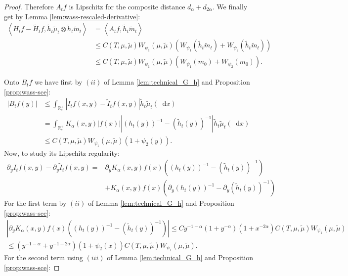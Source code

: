 \documentclass[11pt,a4paper]{article}
\newcommand{\RRP}{\mathbb{R}^+_*}
\newcommand{\brac}[1]{\left\langle#1\right\rangle}
\newcommand{\dd}{\mathop{}\!\mathrm{d}}
\begin{document}
\begin{proof}
    Therefore $A_tf$ is Lipschitz for the composite distance $d_\alpha + d_{2\alpha}$. We finally get by Lemma \ref{lem:wass-rescaled-derivative}:
    \begin{align*}
        \brac{H_tf - \tilde{H}_tf, \tilde{h}_t\tilde{\mu}_t\otimes \tilde{h}_t\tilde{m}_t} 
        &= \brac{A_tf,\tilde{h}_t\tilde{m}_t} \\
        &\leq C(T,\mu,\tilde{\mu}) W_{\psi_1}(\mu,\tilde{\mu}) \left(W_{\psi_1}(\tilde{h}_t\tilde{m}_t) + W_{\psi_2}(\tilde{h}_t\tilde{m}_t) \right)\\
        &\leq C(T,\mu,\tilde{\mu}) W_{\psi_1}(\mu,\tilde{\mu})\left(W_{\psi_1}(m_0) + W_{\psi_2}(m_0) \right).
    \end{align*}

    Onto $B_tf$ we have first by $(ii)$ of Lemma \ref{lem:technical_G_h} and Proposition \ref{prop:wass-sce}:
    \begin{align*}
        \left|B_tf(y) \right| 
        &\leq \int_{\RRP} \left| I_tf(x,y) - \tilde{I}_tf(x,y)\right| \tilde{h}_t \tilde{\mu}_t(\dd x) \\
        &= \int_{\RRP} K_\alpha(x,y) |f(x)| \left| \left(h_t(y) \right)^{-1} - \left(\tilde{h}_t(y) \right)^{-1} \right| \tilde{h}_t \tilde{\mu}_t(\dd x) \\
        &\leq C(T,\mu,\tilde{\mu}) W_{\psi_1}(\mu,\tilde{\mu})   (1 + \psi_2(y)).
    \end{align*}
    Now, to study its Lipschitz regularity:
    \begin{align*}
        \partial_y I_tf(x,y) - \partial_y \tilde{I}_tf(x,y) 
        =& \partial_y K_\alpha(x,y) f(x)\left( \left(h_t(y) \right)^{-1} - \left(\tilde{h}_t(y) \right)^{-1} \right) \\
        &+  K_\alpha(x,y) f(x)\left( \partial_y \left(h_t(y) \right)^{-1} - \partial_y \left(\tilde{h}_t(y) \right)^{-1} \right) 
    \end{align*}
    For the first term by $(ii)$ of Lemma \ref{lem:technical_G_h} and Proposition \ref{prop:wass-sce}:
    \begin{align*}
        \left| \partial_y K_\alpha(x,y) f(x)\left( \left(h_t(y) \right)^{-1} - \left(\tilde{h}_t(y) \right)^{-1} \right) \right| 
        \leq C y^{-1-\alpha} (1 + y^{-\alpha}) (1 + x^{-2\alpha}) C(T,\mu,\tilde{\mu}) W_{\psi_1}(\mu,\tilde{\mu}) \\
        \leq (y^{-1-\alpha} + y^{-1-2\alpha})(1 + \psi_2(x)) C(T,\mu,\tilde{\mu})  W_{\psi_1}(\mu,\tilde{\mu}).
    \end{align*}
    For the second term using $(iii)$ of Lemma \ref{lem:technical_G_h} and Proposition \ref{prop:wass-sce}:

\end{proof}
\end{document}
